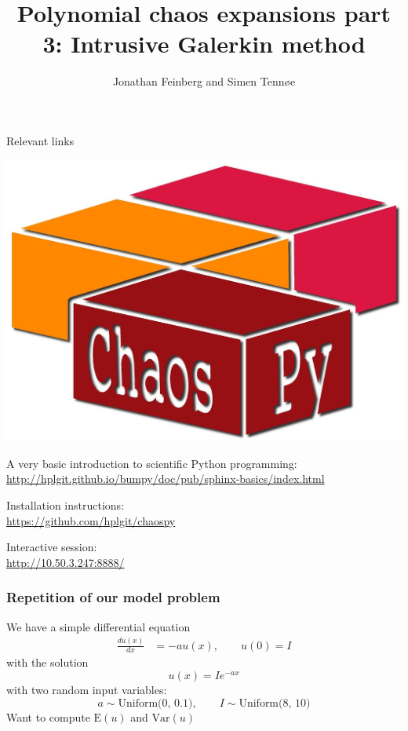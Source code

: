 \documentclass{beamer}
\title{Polynomial chaos expansions part 3: Intrusive Galerkin method}
\author{Jonathan Feinberg and Simen Tennøe}
\newcommand{\E}[1]{\mbox{E}\!\left( #1 \right)}
\newcommand{\Var}[1]{\mbox{Var}\!\left( #1 \right)}
\begin{document}
\begin{frame}
  \maketitle
\end{frame}



\begin{frame}[fragile]{Relevant links}
  \begin{center}
     \includegraphics[width=.5\textwidth]{chaospy_logo.jpg}
  \end{center}
    \begin{alert}{A very basic introduction to scientific Python programming:}
    \scriptsize
      \href{http://hplgit.github.io/bumpy/doc/pub/sphinx-basics/index.html}{http://hplgit.github.io/bumpy/doc/pub/sphinx-basics/index.html}\\
  \end{alert}
  \begin{alert}{Installation instructions:}\\
  \scriptsize
      \href{https://github.com/hplgit/chaospy}{https://github.com/hplgit/chaospy}\\
  \end{alert}
    \begin{alert}{Interactive session:}\\
  \scriptsize
\href{http://10.50.3.247:8888/}{http://10.50.3.247:8888/}

  \end{alert}
\end{frame}


\begin{frame}
 \frametitle{Repetition of our model problem}
  We have a simple differential equation
  \begin{align*}
    \frac{d u(x)}{dx} & =-au(x),\qquad u(0) = I
  \end{align*}
  \pause
  with the solution
  \[u(x) = Ie^{-ax}\]
  \pause
  with two random input variables:
   \[a \sim \text{Uniform(0, 0.1)}, \qquad I \sim \text{Uniform(8, 10)}\]
  Want to compute $\E{u}$ and $\Var{u}$
\end{frame}
\end{document}
